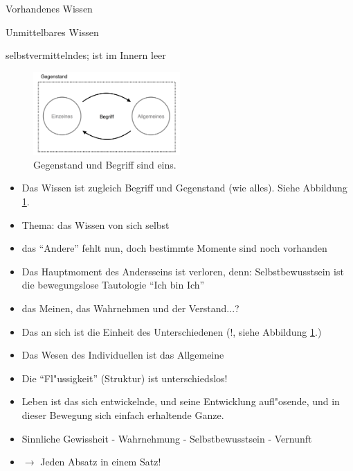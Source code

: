 \documentclass[emulatestandardclasses]{scrartcl}
\begin{document}
\begin{description}[leftmargin=!,labelwidth=\widthof{\bfseries Negation der Negation}]
  \item[Meinen] Vorhandenes Wissen
  \item[Wahrnehmen] Unmittelbares Wissen
  \item[Verstand] selbstvermittelndes; ist im Innern leer
\end{description}

\begin{figure}[h]
	\centering
	\includegraphics[width=0.5\textwidth]{images/gegenstand}
	\caption{Gegenstand und Begriff sind eins.}
	\label{fig:gegenstand}
\end{figure}

\begin{itemize}
  \item Das Wissen ist zugleich Begriff und Gegenstand (wie alles). Siehe Abbildung \ref{fig:gegenstand}.
  \item Thema: das Wissen von sich selbst
  \item das "`Andere"' fehlt nun, doch bestimmte Momente sind noch vorhanden
  \item Das Hauptmoment des Andersseins ist verloren, denn: Selbstbewusstsein ist die bewegungslose Tautologie "`Ich bin Ich"'
  \item das Meinen, das Wahrnehmen und der Verstand...?
  \item Das an sich ist die Einheit des Unterschiedenen (!, siehe Abbildung \ref{fig:gegenstand}.)
  \item Das Wesen des Individuellen ist das Allgemeine
  \item Die "`Fl"ussigkeit"' (Struktur) ist unterschiedslos!
  \item Leben ist das sich entwickelnde, und seine Entwicklung aufl"osende, und in dieser Bewegung sich einfach erhaltende Ganze.
  \item Sinnliche Gewissheit - Wahrnehmung - Selbstbewusstsein - Vernunft
  \item $\rightarrow$ Jeden Absatz in einem Satz!
\end{itemize}
\end{document}

